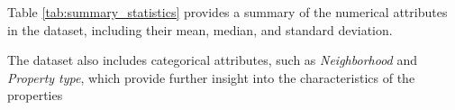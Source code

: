 \documentclass[twocolumn]{article}
\begin{document}
Table \ref{tab:summary_statistics} provides a summary of the numerical attributes in the dataset, including their mean, median, and standard deviation.

\begin{table}[h!]
\centering
{}
\caption{Summary statistics for key numerical attributes.}
\label{tab:summary_statistics}
\end{table}

The dataset also includes categorical attributes, such as \textit{Neighborhood} and \textit{Property type}, which provide further insight into the characteristics of the properties
\end{document}
